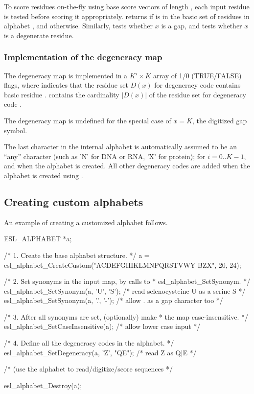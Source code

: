 To score residues on-the-fly using base score vectors of length
, each input residue  is tested before scoring it
appropriately.   returns  if
 is in the basic set of  residues in alphabet
, and  otherwise. Similarly,
 tests whether $x$ is a gap, and
 tests whether $x$ is a degenerate
residue.

\subsubsection{Implementation of the degeneracy map}

The degeneracy map is implemented in a $K' \times K$ array
 of 1/0 (TRUE/FALSE) flags, where
 indicates that the residue set $D(x)$
for degeneracy code  contains basic residue .
 contains the cardinality $|D(x)|$ of the residue
set for degeneracy code .

The degeneracy map is undefined for the special case of $x=K$, the
digitized gap symbol.

The last character in the internal alphabet is automatically assumed
to be an ``any'' character (such as 'N' for DNA or RNA, 'X' for
protein);  for $i=0..K-1$, and
 when the alphabet is created. All other
degeneracy codes are added when the alphabet is created using
.

\subsection{Creating custom alphabets}

An example of creating a customized alphabet follows.

\begin{cchunk}
  ESL_ALPHABET *a;

  /* 1. Create the base alphabet structure.
   */
  a = esl_alphabet_CreateCustom("ACDEFGHIKLMNPQRSTVWY-BZX", 20, 24);

  /* 2. Set synonyms in the input map, by calls to
   *    esl_alphabet_SetSynonym.
   */
  esl_alphabet_SetSynonym(a, 'U', 'S');     /* read selenocysteine U as a serine S */
  esl_alphabet_SetSynonym(a, '.', '-');     /* allow . as a gap character too */

  /* 3. After all synonyms are set, (optionally) make
   *    the map case-insensitive.
   */
  esl_alphabet_SetCaseInsensitive(a);       /* allow lower case input */

  /* 4. Define all the degeneracy codes in the alphabet.
   */
  esl_alphabet_SetDegeneracy(a, 'Z', "QE"); /* read Z as {Q|E} */

  /* (use the alphabet to read/digitize/score sequences */

  esl_alphabet_Destroy(a);
\end{cchunk}



